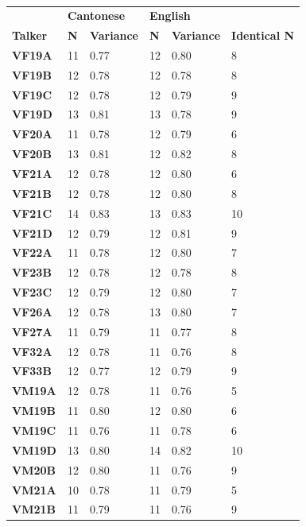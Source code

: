 \begin{table}[htbp]
    \caption{}
\label{ch3:tab:componentcount}
\centering
    \begin{tabular}{llllll}
    \toprule
     & \multicolumn{2}{l}{\textbf{Cantonese}} & \multicolumn{2}{l}{\textbf{English}} & \textbf{} \\
    \textbf{Talker} & \textbf{N} & \textbf{Variance} & \textbf{N} & \textbf{Variance} & \textbf{Identical N} \\
    \midrule
    \textbf{VF19A} & 11 & 0.77 & 12 & 0.80 & 8 \\
    \textbf{VF19B} & 12 & 0.78 & 12 & 0.78 & 8 \\
    \textbf{VF19C} & 12 & 0.78 & 12 & 0.79 & 9 \\
    \textbf{VF19D} & 13 & 0.81 & 13 & 0.78 & 9 \\
    \textbf{VF20A} & 11 & 0.78 & 12 & 0.79 & 6 \\
    \textbf{VF20B} & 13 & 0.81 & 12 & 0.82 & 8 \\
    \textbf{VF21A} & 12 & 0.78 & 12 & 0.80 & 6 \\
    \textbf{VF21B} & 12 & 0.78 & 12 & 0.80 & 8 \\
    \textbf{VF21C} & 14 & 0.83 & 13 & 0.83 & 10 \\
    \textbf{VF21D} & 12 & 0.79 & 12 & 0.81 & 9 \\
    \textbf{VF22A} & 11 & 0.78 & 12 & 0.80 & 7 \\
    \textbf{VF23B} & 12 & 0.78 & 12 & 0.78 & 8 \\
    \textbf{VF23C} & 12 & 0.79 & 12 & 0.80 & 7 \\
    \textbf{VF26A} & 12 & 0.78 & 13 & 0.80 & 7 \\
    \textbf{VF27A} & 11 & 0.79 & 11 & 0.77 & 8 \\
    \textbf{VF32A} & 12 & 0.78 & 11 & 0.76 & 8 \\
    \textbf{VF33B} & 12 & 0.77 & 12 & 0.79 & 9 \\
    \textbf{VM19A} & 12 & 0.78 & 11 & 0.76 & 5 \\
    \textbf{VM19B} & 11 & 0.80 & 12 & 0.80 & 6 \\
    \textbf{VM19C} & 11 & 0.76 & 11 & 0.78 & 6 \\
    \textbf{VM19D} & 13 & 0.80 & 14 & 0.82 & 10 \\
    \textbf{VM20B} & 12 & 0.80 & 11 & 0.76 & 9 \\
    \textbf{VM21A} & 10 & 0.78 & 11 & 0.79 & 5 \\
    \textbf{VM21B} & 11 & 0.79 & 11 & 0.76 & 9 \\

\end{tabular}
\end{table}
